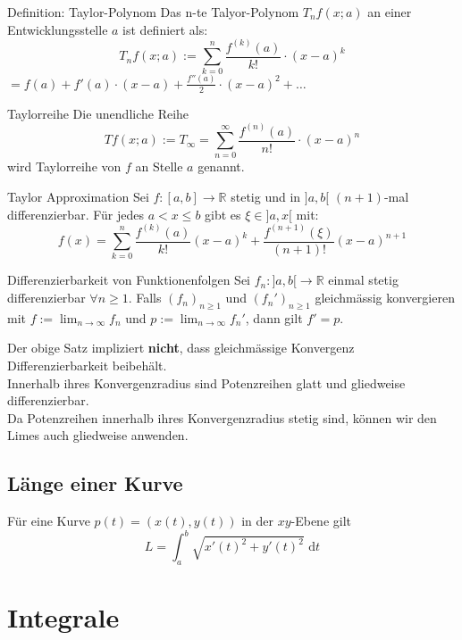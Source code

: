 \documentclass[a4paper,10pt]{article}
\def\limn{\lim_{n\to \infty}}
\def\sumn{\sum_{n=0}^\infty}
\begin{document}
\begin{subbox}{Definition: Taylor-Polynom}
 Das n-te Talyor-Polynom $T_n f(x; a)$ an einer Entwicklungsstelle $a$ ist definiert als:
 $$T_n f(x; a) := \sum_{k=0}^{n} \frac{f^{(k)} (a)}{k!} \cdot (x - a)^k$$ 
 $ = f(a) + f'(a) \cdot (x-a) + \frac{f''(a)}{2} \cdot (x - a)^2 + \ldots$
\end{subbox}
\begin{mainbox}{Taylorreihe}
 Die unendliche Reihe
 $$Tf(x;a) := T_\infty = \sumn \frac{f^{(n)}(a)}{n!} \cdot (x-a)^n$$
 wird Taylorreihe von $f$ an Stelle $a$ genannt.
\end{mainbox}
\begin{subbox}{Taylor Approximation}
  Sei $f: [a, b] \to \mathbb{R}$ stetig und in $]a, b[$ $(n+1)$-mal differenzierbar. Für jedes $a < x \leq b$ gibt es $\xi \in ]a, x[$ mit:\\
  $$f(x) = \sum_{k=0}^n \frac{f^{(k)}(a)}{k!} (x - a)^k + \frac{f^{(n+1)}(\xi)}{(n + 1)!} (x - a)^{n + 1}$$
\end{subbox}
\begin{subbox}{Differenzierbarkeit von Funktionenfolgen}
  Sei $f_n: ]a, b[ \to \mathbb{R}$ einmal stetig differenzierbar $\forall n \geq 1$. Falls $(f_n)_{n \geq 1}$ und $(f_n')_{n \geq 1}$ gleichmässig konvergieren mit $f := \limn f_n$ und $p := \limn f_n'$, dann gilt $f' = p$.  
\end{subbox}
Der obige Satz impliziert \textbf{nicht}, dass gleichmässige Konvergenz Differenzierbarkeit beibehält.\\
Innerhalb ihres Konvergenzradius sind Potenzreihen glatt und gliedweise differenzierbar.\\
Da Potenzreihen innerhalb ihres Konvergenzradius stetig sind, können wir den Limes auch gliedweise anwenden.

\subsection{Länge einer Kurve}
Für eine Kurve $p(t) = (x(t), y(t))$ in der $xy$-Ebene gilt 
$$L = \int_a^b \sqrt{x'(t)^2+ y'(t)^2} \text{ d}t$$

\section{Integrale}
\end{document}
